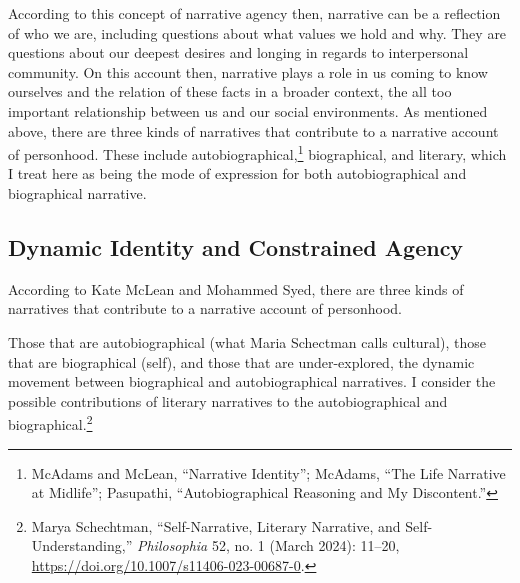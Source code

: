 \documentclass[phdthesis,12pt,final]{wuthesis}
\theoremstyle{definition}
\theoremstyle{definition}
\theoremstyle{definition}
\theoremstyle{definition}
\theoremstyle{remark}
\begin{document}
According to this concept of narrative agency then, narrative can be a reflection of who we are, including questions about what values we hold and why. They are questions about our deepest desires and longing in regards to interpersonal community. On this account then, narrative plays a role in us coming to know ourselves and the relation of these facts in a broader context, the all too important relationship between us and our social environments. As mentioned above, there are three kinds of narratives that contribute to a narrative account of personhood. These include autobiographical,\footnote{McAdams and McLean, {``Narrative {Identity}''}; McAdams, {``The {Life Narrative} at {Midlife}''}; Pasupathi, {``Autobiographical {Reasoning} and {My} {Discontent}.''}} biographical, and literary, which I treat here as being the mode of expression for both autobiographical and biographical narrative.

\subsection*{Dynamic Identity and Constrained Agency}\label{dynamic-identity-and-constrained-agency}

According to Kate McLean and Mohammed Syed, there are three kinds of narratives that contribute to a narrative account of personhood.

Those that are autobiographical (what Maria Schectman calls cultural), those that are biographical (self), and those that are under-explored, the dynamic movement between biographical and autobiographical narratives. I consider the possible contributions of literary narratives to the autobiographical and biographical.\footnote{Marya Schechtman, {``Self-{Narrative}, {Literary Narrative}, and {Self-Understanding},''} \emph{Philosophia} 52, no. 1 (March 2024): 11--20, \url{https://doi.org/10.1007/s11406-023-00687-0}.}
\end{document}
